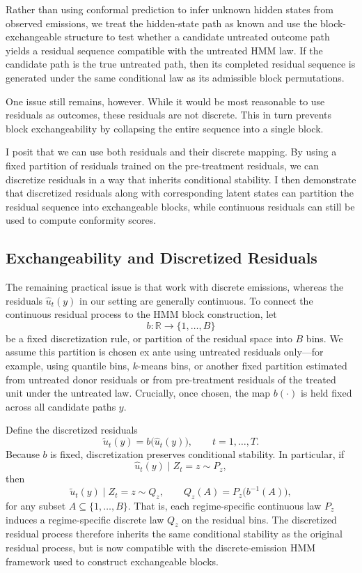 \documentclass{article}
\begin{document}
Rather than using conformal prediction to infer unknown hidden states from observed emissions, we treat the hidden-state path as known and use the block-exchangeable structure to test whether a candidate untreated outcome path yields a residual sequence compatible with the untreated HMM law. If the candidate path is the true untreated path, then its completed residual sequence is generated under the same conditional law as its admissible block permutations.

One issue still remains, however. While it would be most reasonable to use residuals as outcomes, these residuals are not discrete. This in turn prevents block exchangeability by collapsing the entire sequence into a single block.

I posit that we can use both residuals and their discrete mapping. By using a fixed partition of residuals trained on the pre-treatment residuals, we can discretize residuals in a way that inherits conditional stability. I then demonstrate that discretized residuals along with corresponding latent states can partition the residual sequence into exchangeable blocks, while continuous residuals can still be used to compute conformity scores.

\subsection{Exchangeability and Discretized Residuals}

The remaining practical issue is that \citet{Nettasinghe2023} work with discrete emissions, whereas the residuals \(\hat u_t(y)\) in our setting are generally continuous. To connect the continuous residual process to the HMM block construction, let
\[
b:\mathbb R \to \{1,\dots,B\}
\]
be a fixed discretization rule, or partition of the residual space into \(B\) bins. We assume this partition is chosen ex ante using untreated residuals only---for example, using quantile bins, \(k\)-means bins, or another fixed partition estimated from untreated donor residuals or from pre-treatment residuals of the treated unit under the untreated law. Crucially, once chosen, the map \(b(\cdot)\) is held fixed across all candidate paths \(y\).

Define the discretized residuals
\[
\tilde u_t(y)=b\big(\hat u_t(y)\big), \qquad t=1,\dots,T.
\]
Because \(b\) is fixed, discretization preserves conditional stability. In particular, if
\[
\hat u_t(y)\mid Z_t=z \sim P_z,
\]
then
\[
\tilde u_t(y)\mid Z_t=z \sim Q_z,
\qquad
Q_z(A)=P_z\big(b^{-1}(A)\big),
\]
for any subset \(A \subseteq \{1,\dots,B\}\). That is, each regime-specific continuous law \(P_z\) induces a regime-specific discrete law \(Q_z\) on the residual bins. The discretized residual process therefore inherits the same conditional stability as the original residual process, but is now compatible with the discrete-emission HMM framework used to construct exchangeable blocks.
\end{document}
